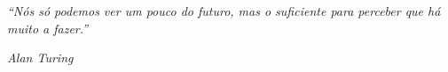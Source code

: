 \newpage

\vspace*{10cm}
\hspace{4cm}\begin{minipage}{.51\textwidth}

\textit{``Nós só podemos ver um pouco do futuro, mas o suficiente para perceber que há muito a fazer.'' }

\begin{flushright}\itshape Alan Turing \upshape\end{flushright}

\end{minipage}